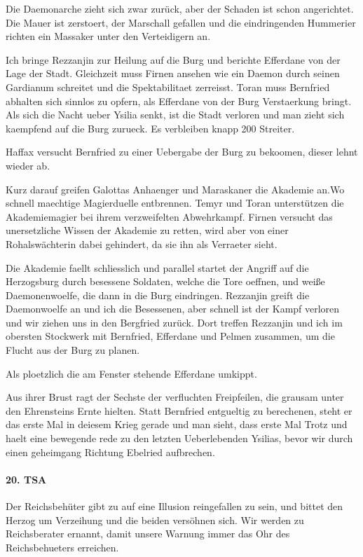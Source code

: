 Die Daemonarche zieht sich zwar zurück, aber der Schaden ist schon angerichtet. Die Mauer ist zerstoert, der Marschall gefallen und die eindringenden Hummerier richten ein Massaker unter den Verteidigern an.

Ich bringe Rezzanjin zur Heilung auf die Burg und berichte Efferdane von der Lage der Stadt. Gleichzeit muss Firnen ansehen wie ein Daemon durch seinen Gardianum schreitet und die Spektabilitaet zerreisst. Toran muss Bernfried abhalten sich sinnlos zu opfern, als Efferdane von der Burg Verstaerkung bringt. Als sich die Nacht ueber Ysilia senkt, ist die Stadt verloren und man zieht sich kaempfend auf die Burg zurueck. Es verbleiben knapp 200 Streiter.

Haffax versucht Bernfried zu einer Uebergabe der Burg zu bekoomen, dieser lehnt wieder ab.

Kurz darauf greifen Galottas Anhaenger und Maraskaner die Akademie an.Wo schnell maechtige Magierduelle entbrennen. Temyr und Toran unterstützen die Akademiemagier bei ihrem verzweifelten Abwehrkampf. Firnen versucht das unersetzliche Wissen der Akademie zu retten, wird aber von einer Rohalswächterin dabei gehindert, da sie ihn als Verraeter sieht.

Die Akademie faellt schliesslich und parallel startet der Angriff auf die Herzogsburg durch besessene Soldaten, welche die Tore oeffnen, und weiße Daemonenwoelfe, die dann in die Burg eindringen. Rezzanjin greift die Daemonwoelfe an und ich die Besessenen, aber schnell ist der Kampf verloren und wir ziehen uns in den Bergfried zurück. Dort treffen Rezzanjin und ich im obersten Stockwerk mit Bernfried, Efferdane und Pelmen zusammen, um die Flucht aus der Burg zu planen.

Als ploetzlich die am Fenster stehende Efferdane umkippt.

Aus ihrer Brust ragt der Sechste der verfluchten Freipfeilen, die grausam unter den Ehrensteins Ernte hielten. Statt Bernfried entgueltig zu berechenen, steht er das erste Mal in deiesem Krieg gerade und man sieht, dass erste Mal Trotz und haelt eine bewegende rede zu den letzten Ueberlebenden Ysilias, bevor wir durch einen geheimgang Richtung Ebelried aufbrechen.

\paragraph{20. TSA}
Der Reichsbehüter gibt zu auf eine Illusion reingefallen zu sein, und bittet den Herzog um Verzeihung und die beiden versöhnen sich. Wir werden zu Reichsberater ernannt, damit unsere Warnung immer das Ohr des Reichsbehueters erreichen.


